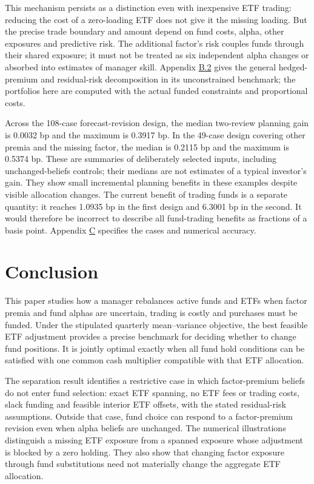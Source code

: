 \documentclass[11pt]{article}
\begin{document}
This mechanism persists as a distinction even with inexpensive ETF trading: reducing the cost of a zero-loading ETF does not give it the missing loading. But the precise trade boundary and amount depend on fund costs, alpha, other exposures and predictive risk. The additional factor's risk couples funds through their shared exposure; it must not be treated as six independent alpha changes or absorbed into estimates of manager skill. Appendix \hyperref[sec:B.2]{B.2} gives the general hedged-premium and residual-risk decomposition in its unconstrained benchmark; the portfolios here are computed with the actual funded constraints and proportional costs.

Across the 108-case forecast-revision design, the median two-review planning gain is 0.0032 bp and the maximum is 0.3917 bp. In the 49-case design covering other premia and the missing factor, the median is 0.2115 bp and the maximum is 0.5374 bp. These are summaries of deliberately selected inputs, including unchanged-beliefs controls; their medians are not estimates of a typical investor's gain. They show small incremental planning benefits in these examples despite visible allocation changes. The current benefit of trading funds is a separate quantity: it reaches 1.0935 bp in the first design and 6.3001 bp in the second. It would therefore be incorrect to describe all fund-trading benefits as fractions of a basis point. Appendix \hyperref[sec:C]{C} specifies the cases and numerical accuracy.

\section{Conclusion}\label{sec:7}

This paper studies how a manager rebalances active funds and ETFs when factor premia and fund alphas are uncertain, trading is costly and purchases must be funded. Under the stipulated quarterly mean--variance objective, the best feasible ETF adjustment provides a precise benchmark for deciding whether to change fund positions. It is jointly optimal exactly when all fund hold conditions can be satisfied with one common cash multiplier compatible with that ETF allocation.

The separation result identifies a restrictive case in which factor-premium beliefs do not enter fund selection: exact ETF spanning, no ETF fees or trading costs, slack funding and feasible interior ETF offsets, with the stated residual-risk assumptions. Outside that case, fund choice can respond to a factor-premium revision even when alpha beliefs are unchanged. The numerical illustrations distinguish a missing ETF exposure from a spanned exposure whose adjustment is blocked by a zero holding. They also show that changing factor exposure through fund substitutions need not materially change the aggregate ETF allocation.
\end{document}
